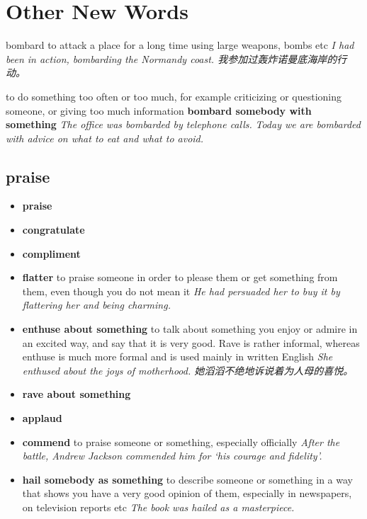 \chapter{Other New Words}

\begin{DefWord}{bombard}
    to attack a place for a long time using large weapons, bombs etc
    \textit{I had been in action, bombarding the Normandy coast. 我参加过轰炸诺曼底海岸的行动。}

    to do something too often or too much, for example criticizing or questioning someone, or giving too much information
    \textbf{bombard somebody with something}
    \textit{The office was bombarded by telephone calls.}
    \textit{Today we are bombarded with advice on what to eat and what to avoid.}

\end{DefWord}

\section{praise}

\begin{itemize}
    \item \textbf{praise}
    \item \textbf{congratulate}
    \item \textbf{compliment}
    \item \textbf{flatter} to praise someone in order to please them or get something from them, even though you do not mean it
    \textit{He had persuaded her to buy it by flattering her and being charming.}
    \item \textbf{enthuse about something} to talk about something you enjoy or admire in an excited way, and say that it is very good. Rave is rather informal, whereas enthuse is much more formal and is used mainly in written English \textit{She enthused about the joys of motherhood. 她滔滔不绝地诉说着为人母的喜悦。}
    \item \textbf{rave about something}
    \item \textbf{applaud}
    \item \textbf{commend} to praise someone or something, especially officially \textit{After the battle, Andrew Jackson commended him for ‘his courage and fidelity’.}
    \item \textbf{hail somebody as something} to describe someone or something in a way that shows you have a very good opinion of them, especially in newspapers, on television reports etc \textit{The book was hailed as a masterpiece.}
\end{itemize}